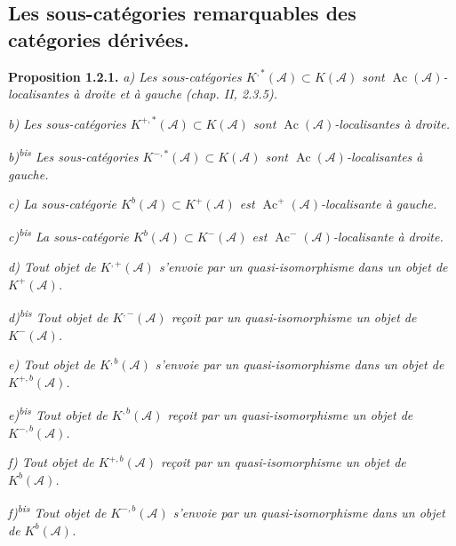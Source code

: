 \clearpage
{}%
\begingroup\small\setlength{\parskip}{0pt}\setlength{\emergencystretch}{1.5em}
\setlength{\abovedisplayskip}{4pt plus 2pt minus 2pt}%
\setlength{\belowdisplayskip}{4pt plus 2pt minus 2pt}%

\subsection{Les sous-catégories remarquables des catégories dérivées.}

\noindent\textbf{Proposition 1.2.1.}\quad
\textit{a) Les sous-catégories
$K^{,*}(\mathcal A)\subset K(\mathcal A)$ sont
$\operatorname{Ac}(\mathcal A)$-localisantes à droite et à gauche
(chap. II, 2.3.5).}

\noindent\textit{b) Les sous-catégories
$K^{+,*}(\mathcal A)\subset K(\mathcal A)$ sont
$\operatorname{Ac}(\mathcal A)$-localisantes à droite.}

\noindent\textit{b)\textsuperscript{bis} Les sous-catégories
$K^{-,*}(\mathcal A)\subset K(\mathcal A)$ sont
$\operatorname{Ac}(\mathcal A)$-localisantes à gauche.}

\noindent\textit{c) La sous-catégorie
$K^{b}(\mathcal A)\subset K^{+}(\mathcal A)$ est
$\operatorname{Ac}^{+}(\mathcal A)$-localisante à gauche.}

\noindent\textit{c)\textsuperscript{bis} La sous-catégorie
$K^{b}(\mathcal A)\subset K^{-}(\mathcal A)$ est
$\operatorname{Ac}^{-}(\mathcal A)$-localisante à droite.}

\noindent\textit{d) Tout objet de $K^{,+}(\mathcal A)$ s'envoie par un
quasi-isomorphisme dans un objet de $K^{+}(\mathcal A)$.}

\noindent\textit{d)\textsuperscript{bis} Tout objet de
$K^{,-}(\mathcal A)$ reçoit par un quasi-isomorphisme un objet de
$K^{-}(\mathcal A)$.}

\noindent\textit{e) Tout objet de $K^{,b}(\mathcal A)$ s'envoie par un
quasi-isomorphisme dans un objet de $K^{+,b}(\mathcal A)$.}

\noindent\textit{e)\textsuperscript{bis} Tout objet de
$K^{,b}(\mathcal A)$ reçoit par un quasi-isomorphisme un objet de
$K^{-,b}(\mathcal A)$.}

\noindent\textit{f) Tout objet de $K^{+,b}(\mathcal A)$ reçoit par un
quasi-isomorphisme un objet de $K^{b}(\mathcal A)$.}

\noindent\textit{f)\textsuperscript{bis} Tout objet de
$K^{-,b}(\mathcal A)$ s'envoie par un quasi-isomorphisme dans un objet de
$K^{b}(\mathcal A)$.}

